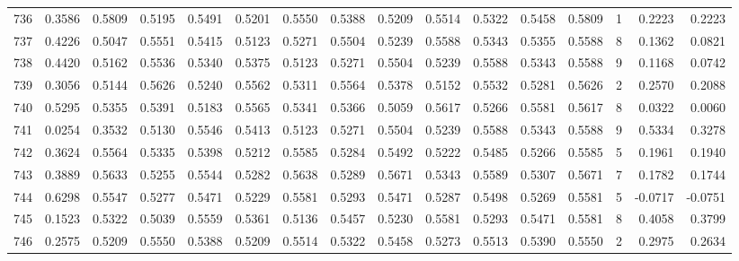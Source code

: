\begin{tabular}{lrrrrrrrrrrrrrrr}
736 &      0.3586 &  0.5809 &  0.5195 &  0.5491 &  0.5201 &  0.5550 &  0.5388 &  0.5209 &  0.5514 &  0.5322 &   0.5458 &     0.5809 &      1 &                    0.2223 &                     0.2223 \\
737 &      0.4226 &  0.5047 &  0.5551 &  0.5415 &  0.5123 &  0.5271 &  0.5504 &  0.5239 &  0.5588 &  0.5343 &   0.5355 &     0.5588 &      8 &                    0.1362 &                     0.0821 \\
738 &      0.4420 &  0.5162 &  0.5536 &  0.5340 &  0.5375 &  0.5123 &  0.5271 &  0.5504 &  0.5239 &  0.5588 &   0.5343 &     0.5588 &      9 &                    0.1168 &                     0.0742 \\
739 &      0.3056 &  0.5144 &  0.5626 &  0.5240 &  0.5562 &  0.5311 &  0.5564 &  0.5378 &  0.5152 &  0.5532 &   0.5281 &     0.5626 &      2 &                    0.2570 &                     0.2088 \\
740 &      0.5295 &  0.5355 &  0.5391 &  0.5183 &  0.5565 &  0.5341 &  0.5366 &  0.5059 &  0.5617 &  0.5266 &   0.5581 &     0.5617 &      8 &                    0.0322 &                     0.0060 \\
741 &      0.0254 &  0.3532 &  0.5130 &  0.5546 &  0.5413 &  0.5123 &  0.5271 &  0.5504 &  0.5239 &  0.5588 &   0.5343 &     0.5588 &      9 &                    0.5334 &                     0.3278 \\
742 &      0.3624 &  0.5564 &  0.5335 &  0.5398 &  0.5212 &  0.5585 &  0.5284 &  0.5492 &  0.5222 &  0.5485 &   0.5266 &     0.5585 &      5 &                    0.1961 &                     0.1940 \\
743 &      0.3889 &  0.5633 &  0.5255 &  0.5544 &  0.5282 &  0.5638 &  0.5289 &  0.5671 &  0.5343 &  0.5589 &   0.5307 &     0.5671 &      7 &                    0.1782 &                     0.1744 \\
744 &      0.6298 &  0.5547 &  0.5277 &  0.5471 &  0.5229 &  0.5581 &  0.5293 &  0.5471 &  0.5287 &  0.5498 &   0.5269 &     0.5581 &      5 &                   -0.0717 &                    -0.0751 \\
745 &      0.1523 &  0.5322 &  0.5039 &  0.5559 &  0.5361 &  0.5136 &  0.5457 &  0.5230 &  0.5581 &  0.5293 &   0.5471 &     0.5581 &      8 &                    0.4058 &                     0.3799 \\
746 &      0.2575 &  0.5209 &  0.5550 &  0.5388 &  0.5209 &  0.5514 &  0.5322 &  0.5458 &  0.5273 &  0.5513 &   0.5390 &     0.5550 &      2 &                    0.2975 &                     0.2634 \\

\end{tabular}
